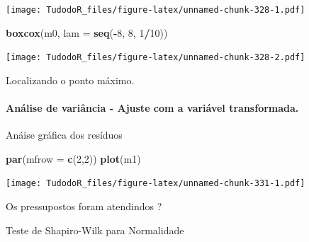 \documentclass[
]{book}
\newenvironment{Shaded}{\begin{snugshade}}{\end{snugshade}}
\newcommand{\DataTypeTok}[1]{\textcolor[rgb]{0.13,0.29,0.53}{#1}}
\newcommand{\DecValTok}[1]{\textcolor[rgb]{0.00,0.00,0.81}{#1}}
\newcommand{\KeywordTok}[1]{\textcolor[rgb]{0.13,0.29,0.53}{\textbf{#1}}}
\newcommand{\NormalTok}[1]{#1}
\newcommand{\OperatorTok}[1]{\textcolor[rgb]{0.81,0.36,0.00}{\textbf{#1}}}
\newcommand{\StringTok}[1]{\textcolor[rgb]{0.31,0.60,0.02}{#1}}
\begin{document}
\texttt{[image: TudodoR\_files/figure-latex/unnamed-chunk-328-1.pdf]}

\begin{Shaded}
\begin{Highlighting}[]
  \KeywordTok{boxcox}\NormalTok{(m0, }\DataTypeTok{lam =} \KeywordTok{seq}\NormalTok{(}\OperatorTok{-}\DecValTok{8}\NormalTok{, }\DecValTok{8}\NormalTok{, }\DecValTok{1}\OperatorTok{/}\DecValTok{10}\NormalTok{))}
\end{Highlighting}
\end{Shaded}

\texttt{[image: TudodoR\_files/figure-latex/unnamed-chunk-328-2.pdf]}

Localizando o ponto máximo.

\hypertarget{anuxe1lise-de-variuxe2ncia---ajuste-com-a-variuxe1vel-transformada.-1}{%
\paragraph{Análise de variância - Ajuste com a variável transformada.}\label{anuxe1lise-de-variuxe2ncia---ajuste-com-a-variuxe1vel-transformada.-1}}

\begin{Shaded}
\end{Shaded}

Anáise gráfica dos resíduos

\begin{Shaded}
\begin{Highlighting}[]
\KeywordTok{par}\NormalTok{(}\DataTypeTok{mfrow =} \KeywordTok{c}\NormalTok{(}\DecValTok{2}\NormalTok{,}\DecValTok{2}\NormalTok{))}
\KeywordTok{plot}\NormalTok{(m1)}
\end{Highlighting}
\end{Shaded}

\texttt{[image: TudodoR\_files/figure-latex/unnamed-chunk-331-1.pdf]}

Os pressupostos foram atendindos ?

Teste de Shapiro-Wilk para Normalidade

\begin{Shaded}
\end{Shaded}
\end{document}
